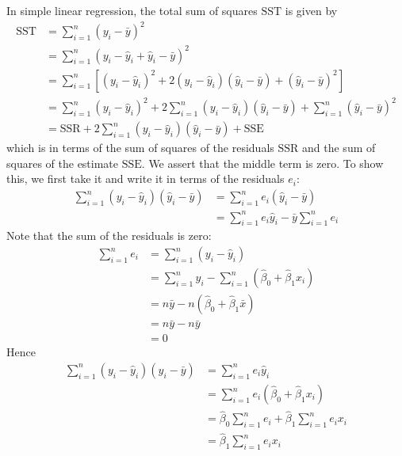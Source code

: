 \documentclass[11pt]{report} %
\begin{document}
In simple linear regression, the total sum of squares $\mathrm{SST}$ is given by
\begin{align}
\mathrm{SST} &= \sum_{i=1}^{n}\left(y_{i}-\bar{y}\right)^{2} \\
&= \sum_{i=1}^{n}\left(y_{i}-\widehat{y}_{i}+\widehat{y}_{i}-\bar{y}\right)^{2} \\
&= \sum_{i=1}^{n}\left[\left(y_{i}-\widehat{y}_{i}\right)^{2}+2\left(y_{i}-\widehat{y}_{i}\right)\left(\widehat{y}_{i}-\bar{y}\right)+\left(\widehat{y}_{i}-\bar{y}\right)^{2}\right] \\
&= \sum_{i=1}^{n}\left(y_{i}-\widehat{y}_{i}\right)^{2}+2\sum_{i=1}^{n}\left(y_{i}-\widehat{y}_{i}\right)\left(\widehat{y}_{i}-\bar{y}\right)+\sum_{i=1}^{n}\left(\widehat{y}_{i}-\bar{y}\right)^{2} \\
&= \mathrm{SSR}+2\sum_{i=1}^{n}\left(y_{i}-\widehat{y}_{i}\right)\left(\widehat{y}_{i}-\bar{y}\right)+\mathrm{SSE}
\end{align}
which is in terms of the sum of squares of the residuals $\mathrm{SSR}$ and the sum of squares of the estimate $\mathrm{SSE}$. We assert that the middle term is zero. To show this, we first take it and write it in terms of the residuals $e_{i}$:
\begin{align}
\sum_{i=1}^{n}\left(y_{i}-\widehat{y}_{i}\right)\left(\widehat{y}_{i}-\bar{y}\right) &= \sum_{i=1}^{n}e_{i}\left(\widehat{y}_{i}-\bar{y}\right) \\
&= \sum_{i=1}^{n}e_{i}\widehat{y}_{i}-\bar{y}\sum_{i=1}^{n}e_{i}
\end{align}
Note that the sum of the residuals is zero:
\begin{align}
\sum_{i=1}^{n}e_{i} &= \sum_{i=1}^{n}\left(y_{i}-\widehat{y}_{i}\right) \\
&= \sum_{i=1}^{n}y_{i}-\sum_{i=1}^{n}\left(\widehat{\beta}_{0}+\widehat{\beta}_{1}x_{i}\right) \\
&= n\bar{y}-n\left(\widehat{\beta}_{0}+\widehat{\beta}_{1}\bar{x}\right) \\
&= n\bar{y}-n\bar{y} \\
&= 0
\end{align}
Hence
\begin{align}
\sum_{i=1}^{n}\left(y_{i}-\widehat{y}_{i}\right)\left(\widehat{y}_{i}-\bar{y}\right) &= \sum_{i=1}^{n}e_{i}\widehat{y}_{i} \\
&= \sum_{i=1}^{n}e_{i}\left(\widehat{\beta}_{0}+\widehat{\beta}_{1}x_{i}\right) \\
&= \widehat{\beta}_{0}\sum_{i=1}^{n}e_{i}+\widehat{\beta}_{1}\sum_{i=1}^{n}e_{i}x_{i} \\
&= \widehat{\beta}_{1}\sum_{i=1}^{n}e_{i}x_{i}
\end{align}
\end{document}
